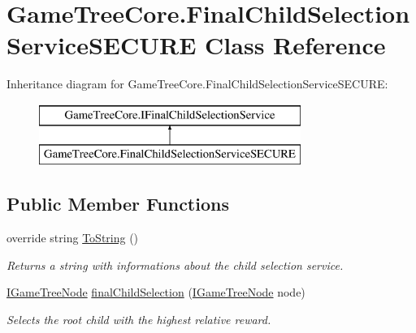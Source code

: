 \hypertarget{class_game_tree_core_1_1_final_child_selection_service_s_e_c_u_r_e}{}\section{Game\+Tree\+Core.\+Final\+Child\+Selection\+Service\+S\+E\+C\+U\+RE Class Reference}
\label{class_game_tree_core_1_1_final_child_selection_service_s_e_c_u_r_e}
Inheritance diagram for Game\+Tree\+Core.\+Final\+Child\+Selection\+Service\+S\+E\+C\+U\+RE\+:\begin{figure}[H]
\begin{center}
\leavevmode
\includegraphics[height=2.000000cm]{class_game_tree_core_1_1_final_child_selection_service_s_e_c_u_r_e}
\end{center}
\end{figure}
\subsection*{Public Member Functions}
\begin{DoxyCompactItemize}
\item 
override string \mbox{\hyperlink{class_game_tree_core_1_1_final_child_selection_service_s_e_c_u_r_e_a4286392c639860e2f188f853b43f8103}{To\+String}} ()
\begin{DoxyCompactList}\small\item\em Returns a string with informations about the child selection service. \end{DoxyCompactList}\item 
\mbox{\hyperlink{interface_game_tree_core_1_1_i_game_tree_node}{I\+Game\+Tree\+Node}} \mbox{\hyperlink{class_game_tree_core_1_1_final_child_selection_service_s_e_c_u_r_e_a766a9bcee0b76d7f12e3093dc315bcc6}{final\+Child\+Selection}} (\mbox{\hyperlink{interface_game_tree_core_1_1_i_game_tree_node}{I\+Game\+Tree\+Node}} node)
\begin{DoxyCompactList}\small\item\em Selects the root child with the highest relative reward. \end{DoxyCompactList}\end{DoxyCompactItemize}


